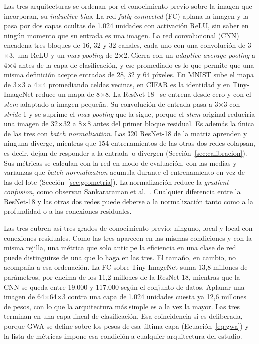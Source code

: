 Las tres arquitecturas se ordenan por el conocimiento previo sobre la imagen que incorporan, su \emph{inductive bias}. La red \emph{fully connected} (FC) aplana la imagen y la pasa por dos capas ocultas de 1.024 unidades con activación ReLU, sin saber en ningún momento que su entrada es una imagen. La red convolucional (CNN) encadena tres bloques de 16, 32 y 32 canales, cada uno con una convolución de 3$\times$3, una ReLU y un \emph{max pooling} de 2$\times$2. Cierra con un \emph{adaptive average pooling} a 4$\times$4 antes de la capa de clasificación, y ese promediado es lo que permite que una misma definición acepte entradas de 28, 32 y 64 píxeles. En MNIST sube el mapa de 3$\times$3 a 4$\times$4 promediando celdas vecinas, en CIFAR es la identidad y en Tiny-ImageNet reduce un mapa de 8$\times$8. La ResNet-18~\cite{he2015deep} se entrena desde cero y con el \emph{stem} adaptado a imagen pequeña. Su convolución de entrada pasa a 3$\times$3 con \emph{stride} 1 y se suprime el \emph{max pooling} que la sigue, porque el \emph{stem} original reduciría una imagen de 32$\times$32 a 8$\times$8 antes del primer bloque residual. Es además la única de las tres con \emph{batch normalization}. Las 320 ResNet-18 de la matriz aprenden y ninguna diverge, mientras que 154 entrenamientos de las otras dos redes colapsan, es decir, dejan de responder a la entrada, o divergen (Sección~\ref{sec:calibracion}). Sus métricas se calculan con la red en modo de evaluación, con las medias y varianzas que \emph{batch normalization} acumula durante el entrenamiento en vez de las del lote (Sección~\ref{sec:geometria}). La normalización reduce la \emph{gradient confusion}, como observan Sankararaman et al.~\cite{sankararaman2020impact}. Cualquier diferencia entre la ResNet-18 y las otras dos redes puede deberse a la normalización tanto como a la profundidad o a las conexiones residuales.

Las tres cubren así tres grados de conocimiento previo: ninguno, local y local con conexiones residuales. Como las tres aparecen en las mismas condiciones y con la misma rejilla, una métrica que solo anticipe la eficiencia en una clase de red puede distinguirse de una que lo haga en las tres. El tamaño, en cambio, no acompaña a esa ordenación. La FC sobre Tiny-ImageNet suma 13,8 millones de parámetros, por encima de los 11,2 millones de la ResNet-18, mientras que la CNN se queda entre 19.000 y 117.000 según el conjunto de datos. Aplanar una imagen de 64$\times$64$\times$3 contra una capa de 1.024 unidades cuesta ya 12,6 millones de pesos, con lo que la arquitectura más simple es a la vez la mayor. Las tres terminan en una capa lineal de clasificación. Esa coincidencia sí es deliberada, porque GWA se define sobre los pesos de esa última capa (Ecuación~\ref{eq:gwa}) y la lista de métricas impone esa condición a cualquier arquitectura del estudio.

